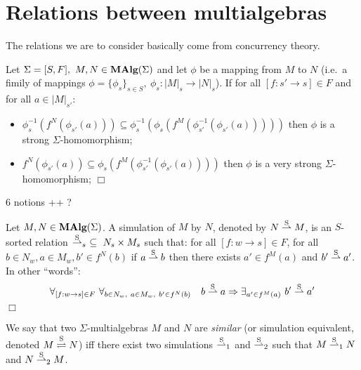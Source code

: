 %
%
\section{Relations between multialgebras}

The relations we are to consider basically come from concurrency
theory. 
\begin{Definition}
Let $\Sigma = [S,F],\ M,N \in \mbox{\rm\bf MAlg}(\Sigma)$ and let $\phi$ be a
mapping from $M$ to $N$ (i.e.\ a fimily of mappings $\phi =
\{\phi_s\}_{s \in S},\ \phi_s: |M|_s \rightarrow |N|_s$). If for all
$[f : s' \rightarrow s] \in F$ and for all $a \in |M|_{s'}$:
\begin{itemize}
\item{ $\phi_s^{-1}(f^N(\phi_{s'}(a))) \subseteq
       \phi^{-1}_s(\phi_s(f^M(\phi^{-1}_{s'}(\phi_{s'}(a)))))$
      then $\phi$ is a strong $\Sigma$-homomorphism; }
\item{ $f^N(\phi_{s'}(a)) \subseteq
       \phi_s(f^M(\phi^{-1}_{s'}(\phi_{s'}(a))))$
       then $\phi$ is a very strong $\Sigma$-homomorphism; \hfill$\Box$}
\end{itemize}
\end{Definition}


\begin{Definition}
6 notions ++ ?
\end{Definition}


\begin{Definition}
Let $M,N \in \mbox{\rm\bf MAlg}(\Sigma)$. A simulation of $M$ by $N$, denoted by
$N \stackrel{\rm S}{\rightharpoonup} M$, is an $S$-sorted relation $\stackrel{\rm S}{\rightharpoonup}_s\ \subseteq\ N_s
\times M_s$ such that: for all $[f : w \rightarrow s] \in F$, for all
$b \in N_w, a \in M_w, b' \in f^N(b)$ if $a \stackrel{\rm S}{\rightharpoonup} b$ then there
exists $a' \in f^M(a)$ and $b' \stackrel{\rm S}{\rightharpoonup} a'$. In other ``words'':
\[
\forall_{[f : w \rightarrow s] \in F} 
\ \forall_{b \in N_w,\ a \in M_w,\ b' \in f^N(b)}
\quad b \stackrel{\rm S}{\rightharpoonup} a \Rightarrow \exists_{a' \in f^M(a)}\ b' \stackrel{\rm S}{\rightharpoonup} a' 
\]
\hfill$\Box$
\end{Definition}
%
We say that two $\Sigma$-multialgebras $M$ and $N$ are {\em similar\/}
(or simulation equivalent, denoted $M \stackrel{\rm S}{\rightleftharpoons} N$) iff there exist two
simulations $\stackrel{\rm S}{\rightharpoonup}_1$ and $\stackrel{\rm S}{\rightharpoonup}_2$ such that $M \stackrel{\rm S}{\rightharpoonup}_1 N$ and $N
\stackrel{\rm S}{\rightharpoonup}_2 M$.



